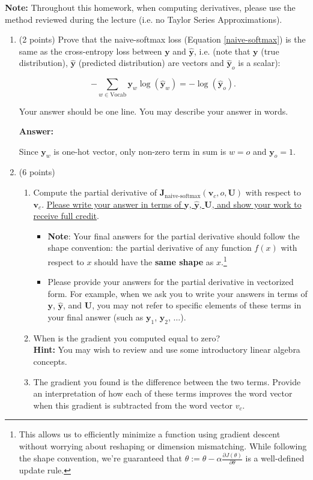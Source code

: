 \documentclass{article}
\newenvironment{answer}{
    {\bf Answer:} \sf \begingroup\color{red}
}{\endgroup}%
\begin{document}
\textbf{Note:} Throughout this homework, when computing derivatives, please use the method reviewed during the lecture (i.e. no Taylor Series Approximations).

\clearpage 
\begin{enumerate}[label=(\alph*)]
\item (2 points) 
Prove that the naive-softmax loss (Equation \ref{naive-softmax}) is the same as the cross-entropy loss between $\bm y$  and $\hat{\bm y}$, i.e. (note that $\bm y$ 
 (true distribution), $\hat{\bm y}$ (predicted distribution) are vectors and $\hat{\bm y}_o$ is a scalar):

\begin{equation} 
-\sum_{w \in \text{Vocab}} \bm y_w \log(\hat{\bm y}_w) = - \log (\hat{\bm y}_o).
\end{equation}

Your answer should be one line. You may describe your answer in words.
\begin{shaded}
\begin{answer}
Since $\bm y_w$ is one-hot vector, only non-zero term in sum is $w=o$ and $\bm y_o = 1$.
\end{answer}
\end{shaded}

\item (6 points)
\begin{enumerate}[label=(\roman*)]
    \item 
    Compute the partial derivative of $\bm J_{\text{naive-softmax}}(\bm v_c, o, \bm U)$ with respect to $\bm v_c$. \ul{Please write your answer in terms of $\bm y$, $\hat{\bm y}$, $\bm U$, and show your work to receive full credit}.
    \begin{itemize} 
        \item \textbf{Note}: Your final answers for the partial derivative should follow the shape convention: the partial derivative of any function $f(x)$ with respect to $x$ should have the \textbf{same shape} as $x$.\footnote{This allows us to efficiently minimize a function using gradient descent without worrying about reshaping or dimension mismatching. While following the shape convention, we're guaranteed that $\theta:= \theta - \alpha\frac{\partial J(\theta)}{\partial \theta}$ is a well-defined update rule.}
        \item Please provide your answers for the partial derivative in vectorized form. For example, when we ask you to write your answers in terms of $\bm y$, $\hat{\bm y}$, and $\bm U$, you may not refer to specific elements of these terms in your final answer (such as $\bm y_1$, $\bm y_2$, $\dots$). 
    \end{itemize}
    \item
    When is the gradient you computed equal to zero? \\
    \textbf{Hint:} You may wish to review and use some introductory linear algebra concepts.
    \item
    The gradient you found is the difference between the two terms. Provide an interpretation of how each of these terms improves the word vector when this gradient is subtracted from the word vector $v_c$.


\end{enumerate}
\end{enumerate}
\end{document}
